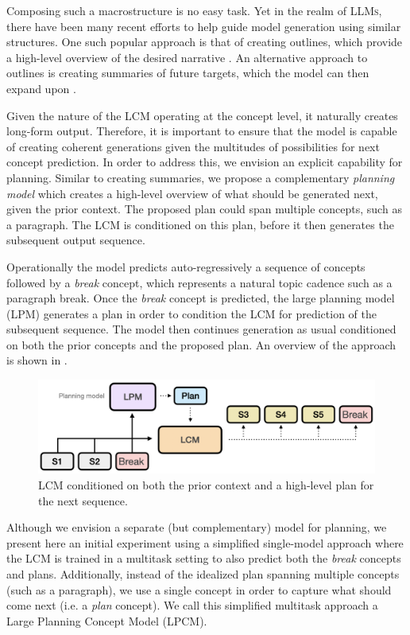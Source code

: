 \documentclass[twoside,11pt]{fairmeta}
\newcommand{\llms}{\textsc{LLMs}\xspace}
\newcommand{\lcm}{\textsc{LCM}\xspace}
\newcommand{\planlcm}{\textsc{LPCM}\xspace}
\begin{document}
Composing such a macrostructure is no easy task. Yet in the realm of \llms, there have been many recent efforts to help guide model generation using similar structures. One such popular approach is that of creating outlines, which provide a high-level overview of the desired narrative \citep{li2024advancingpreciseoutlineconditionedtext}. An alternative approach to outlines is creating summaries of future targets, which the model can then expand upon \citep{sun-etal-2022-summarize}. 

Given the nature of the \lcm operating at the concept level, it naturally creates long-form output. Therefore, it is important to ensure that the model is capable of creating coherent generations given the multitudes of possibilities for next concept prediction. In order to address this, we envision an 
explicit capability for planning. Similar to creating summaries, we propose a complementary \emph{planning model} which creates a high-level overview of what should be generated next, given the prior context. The proposed plan could span multiple concepts, such as a paragraph. The \lcm is conditioned on this plan, before it then generates the subsequent output sequence. 

Operationally the model predicts auto-regressively a sequence of concepts followed by a \emph{break} concept, which represents a natural topic cadence such as a paragraph break. Once the \emph{break} concept is predicted, the large planning model (LPM) generates a plan in order to condition the \lcm for prediction of the subsequent sequence. The model then continues generation as usual conditioned on both the prior concepts and the proposed plan. An overview of the approach is shown in .

\begin{figure}[ht!]
    \centering
    \includegraphics[width=0.60\linewidth]{figures/LPCM.png}
    \caption{\lcm conditioned on both the prior context and a high-level plan for the next sequence.}
    \label{fig:three_level_lcm}
\end{figure}

\noindent Although we envision a separate (but complementary) model for planning, 
we present here an initial experiment using a simplified single-model approach
where the \lcm is trained in a multitask setting to also predict both the \emph{break} concepts and plans.
Additionally, instead of the idealized plan spanning multiple concepts (such as a paragraph), 
we use a single concept in order to capture what should come next (i.e. a \emph{plan} concept).
We call this simplified multitask approach a Large Planning Concept Model (\planlcm). 
\end{document}
